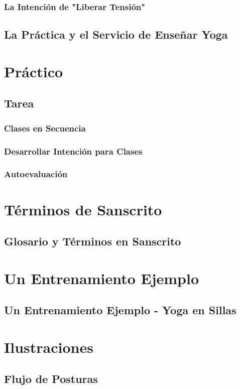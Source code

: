 \documentclass[a4paper]{article}
\begin{document}
\subsubsection{La Intención de "Liberar Tensión"}
\subsection{La Práctica y el Servicio de Enseñar Yoga}

\section{Práctico}
\subsection{Tarea}
\subsubsection{Clases en Secuencia}
\subsubsection{Desarrollar Intención para Clases}
\subsubsection{Autoevaluación}

\section{Términos de Sanscrito}
\subsection{Glosario y Términos en Sanscrito}

\section{Un Entrenamiento Ejemplo}
\subsection{Un Entrenamiento Ejemplo - Yoga en Sillas}

\section{Ilustraciones}
\subsection{Flujo de Posturas}
\end{document}
